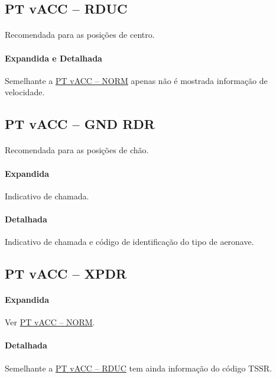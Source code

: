 \documentclass[10pt]{report}
\begin{document}
\subsection{PT vACC – RDUC}
\label{sec:tag-rduc}

\paragraph*{} Recomendada para as posições de centro.

\paragraph*{Expandida e Detalhada} Semelhante a \hyperref[sec:tag-norm]{PT vACC – NORM} apenas não é mostrada
informação de velocidade.

\subsection{PT vACC – GND RDR}

\paragraph*{} Recomendada para as posições de chão.

\paragraph*{Expandida} Indicativo de chamada.

\paragraph*{Detalhada} Indicativo de chamada e código de identificação do tipo de aeronave.

\subsection{PT vACC – XPDR}

\paragraph*{Expandida} Ver \hyperref[sec:tag-norm]{PT vACC – NORM}.

\paragraph*{Detalhada} Semelhante a \hyperref[sec:tag-rduc]{PT vACC – RDUC} tem ainda informação do
código TSSR.
\end{document}
